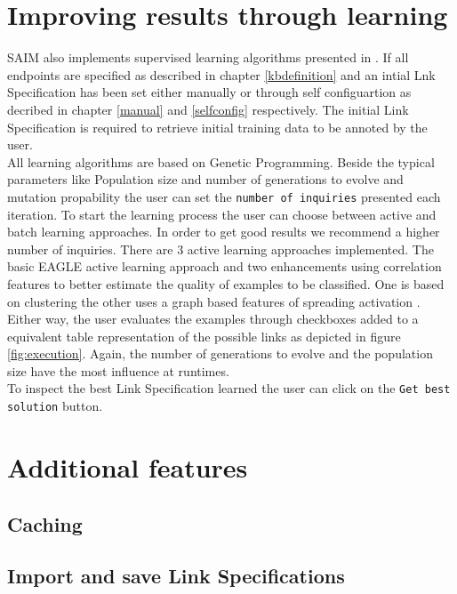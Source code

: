 \documentclass[oneside,a4paper,12pt]{memoir}
\begin{document}
\chapter{Improving results through learning}
\label{learning}
SAIM also implements supervised learning algorithms presented in \cite{NGLY12}. If all endpoints are specified as described in chapter \ref{kbdefinition} and an intial Lnk Specification has been set either manually or through self configuartion as decribed in chapter \ref{manual} and \ref{selfconfig} respectively. The initial Link Specification is required to retrieve initial training data to be annoted by the user.\\
All learning algorithms are based on Genetic Programming. Beside the typical parameters like Population size and number of generations to evolve and mutation propability the user can set the \texttt{number of inquiries} presented each iteration. To start the learning process the user can choose between active and batch learning approaches. In order to get good results we recommend a higher number of inquiries. There are 3 active learning approaches implemented. The basic EAGLE active learning approach \cite{NGLY12} and two enhancements using correlation features to better estimate the quality of examples to be classified. One is based on clustering the other uses a graph based features of spreading activation \cite{NGO+13}.\\
Either way, the user evaluates the examples through checkboxes added to a equivalent table representation of the possible links as depicted in figure \ref{fig:execution}. Again, the number of generations to evolve and the population size have the most influence at runtimes.\\
To inspect the best Link Specification learned the user can click on the \texttt{Get best solution} button.

\chapter{Additional features}
\label{features}


\section{Caching}
\label{caching}


\section{Import and save Link Specifications}
\label{ImportExport}
\end{document}
